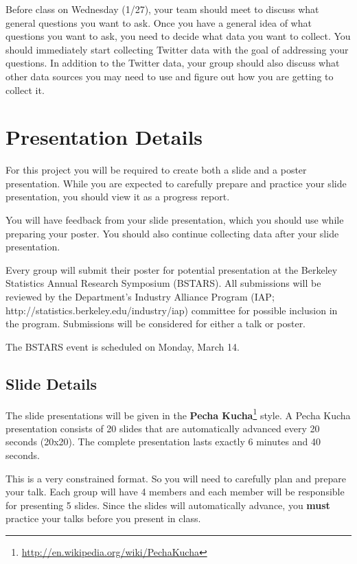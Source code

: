 \documentclass[11pt, oneside]{article}   	%
\begin{document}
Before class on Wednesday (1/27), your team should meet to discuss what general
questions you want to ask.  Once you have a general idea of what questions you
want to ask, you need to decide what data you want to collect.  You should
immediately start collecting Twitter data with the goal of addressing your
questions.  In addition to the Twitter data, your group should also discuss
what other data sources you may need to use and figure out how you are getting
to collect it.



\section{Presentation Details}

For this project you will be required to create both a slide and a poster
presentation.  While you are expected to carefully prepare and practice your
slide presentation, you should view it as a progress report.

You will have feedback from your slide presentation, which you should use
while preparing your poster.  You should also continue collecting data
after your slide presentation.

Every group will submit their poster for potential presentation at the Berkeley
Statistics Annual Research Symposium (BSTARS).  All submissions will be
reviewed by the Department's Industry Alliance Program (IAP;
http://statistics.berkeley.edu/industry/iap) committee for possible inclusion
in the program.  Submissions will be considered for either a talk or poster.

The BSTARS event is scheduled on Monday, March 14.

\subsection{Slide Details}

The slide presentations will be given in the \textbf{Pecha
Kucha}\footnote{\url{http://en.wikipedia.org/wiki/PechaKucha}} style.  A Pecha
Kucha presentation consists of 20 slides that are automatically advanced every
20 seconds (20x20).  The complete presentation lasts exactly 6 minutes and 40
seconds.

This is a very constrained format.  So you will need to carefully plan and
prepare your talk.  Each group will have 4 members and each member will be
responsible for presenting 5 slides.  Since the slides will automatically
advance, you \textbf{must} practice your talks before you present in class.
\end{document}
